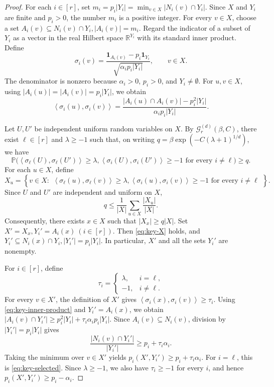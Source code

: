 \documentclass[twoside,12pt]{article}
\theoremstyle{definition}
\theoremstyle{remark}
\newcommand{\Pp}{\mathbb P}
\newcommand{\R}{\mathbb R}
\newcommand{\1}{\mathbf 1}
\newcommand{\ip}[2]{\left\langle #1,#2\right\rangle}
\begin{document}
\begin{proof}
For each $i\in[r]$, set
$
 m_i=p_i|Y_i|
 =\min_{v\in X}|N_i(v)\cap Y_i|.
$
Since $X$ and $Y_i$ are finite and $p_i>0$, the number $m_i$ is a positive
integer. For every $v\in X$, choose a set
$A_i(v)\subseteq N_i(v)\cap Y_i,
 |A_i(v)|=m_i.
$
Regard the indicator of a subset of $Y_i$ as a vector in the real Hilbert
space $\R^{Y_i}$ with its standard inner product. Define
\[
 \sigma_i(v)=
 \frac{\1_{A_i(v)}-p_i\1_{Y_i}}
 {\sqrt{\alpha_ip_i|Y_i|}},
 \qquad v\in X.
\]
The denominator is nonzero because $\alpha_i>0$, $p_i>0$, and
$Y_i\ne\emptyset$. For $u,v\in X$, using
$|A_i(u)|=|A_i(v)|=p_i|Y_i|$, we obtain
\begin{equation}\label{eq:key-inner-product}
 \ip{\sigma_i(u)}{\sigma_i(v)}
 =\frac{|A_i(u)\cap A_i(v)|-p_i^2|Y_i|}
 {\alpha_ip_i|Y_i|}.
\end{equation}

Let $U,U'$ be independent uniform random variables on $X$. By
$\mathcal G_r^{(d)}(\beta,C)$, there exist $\ell\in[r]$ and
$\lambda\ge-1$ such that, on writing
$q=\beta\exp\!\left(-C(\lambda+1)^{1/d}\right)$,
we have
\[
 \Pp\bigl(
  \ip{\sigma_\ell(U)}{\sigma_\ell(U')}\ge\lambda,
  \ip{\sigma_i(U)}{\sigma_i(U')}\ge-1
  \text{ for every }i\ne\ell
 \bigr)\ge q.
\]
For each $u\in X$, define
\[
 X_u=\left\{v\in X:
 \begin{array}{l}
  \ip{\sigma_\ell(u)}{\sigma_\ell(v)}\ge\lambda,
  \ip{\sigma_i(u)}{\sigma_i(v)}\ge-1
  \text{ for every }i\ne\ell
 \end{array}
 \right\}.
\]
Since $U$ and $U'$ are independent and uniform on $X$,
\[
 q\le\frac1{|X|}\sum_{u\in X}\frac{|X_u|}{|X|}.
\]
Consequently, there exists $x\in X$ such that $|X_x|\ge q|X|$. Set
$
 X'=X_x,
 Y_i'=A_i(x)
~(i\in[r]).
$
Then \eqref{eq:key-X} holds, and
$
 Y_i'\subseteq N_i(x)\cap Y_i,
 |Y_i'|=p_i|Y_i|.
$
In particular, $X'$ and all the sets $Y_i'$ are nonempty.

For $i\in[r]$, define
\[
 \tau_i=
 \begin{cases}
  \lambda,&i=\ell,\\
  -1,&i\ne\ell.
 \end{cases}
\]
For every $v\in X'$, the definition of $X'$ gives
$\ip{\sigma_i(x)}{\sigma_i(v)}\ge\tau_i$. Using
\eqref{eq:key-inner-product} and $Y_i'=A_i(x)$, we obtain
$
 |A_i(v)\cap Y_i'|
 \ge p_i^2|Y_i|+\tau_i\alpha_ip_i|Y_i|.
$
Since $A_i(v)\subseteq N_i(v)$, division by
$|Y_i'|=p_i|Y_i|$ gives
\[
 \frac{|N_i(v)\cap Y_i'|}{|Y_i'|}
 \ge p_i+\tau_i\alpha_i.
\]
Taking the minimum over $v\in X'$ yields
$
 p_i(X',Y_i')\ge p_i+\tau_i\alpha_i.
$
For $i=\ell$, this is \eqref{eq:key-selected}. Since $\lambda\ge-1$, we
also have $\tau_i\ge-1$ for every $i$, and hence
$p_i(X',Y_i')\ge p_i-\alpha_i$.
\end{proof}
\end{document}
